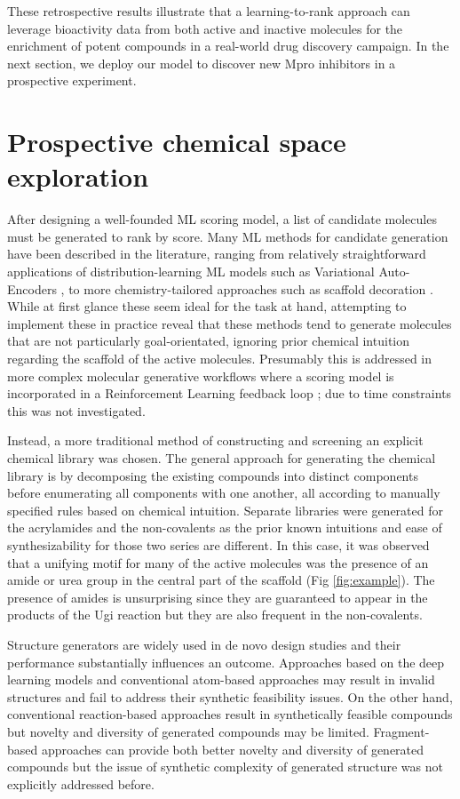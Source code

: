 These retrospective results illustrate that a learning-to-rank approach can leverage bioactivity data from both active and inactive molecules for the enrichment of potent compounds in a real-world drug discovery campaign. In the next section, we deploy our model to discover new Mpro inhibitors in a prospective experiment.

\section{Prospective chemical space exploration}

After designing a well-founded ML scoring model, a list of candidate molecules must be generated to rank by score. Many ML methods for candidate generation have been described in the literature, ranging from relatively straightforward applications of distribution-learning ML models such as Variational Auto-Encoders \cite{Bombarelli2018VAE}, to more chemistry-tailored approaches such as scaffold decoration \cite{Pous2020scaffold}. While at first glance these seem ideal for the task at hand, attempting to implement these in practice reveal that these methods tend to generate molecules that are not particularly goal-orientated, ignoring prior chemical intuition regarding the scaffold of the active molecules. Presumably this is addressed in more complex molecular generative workflows where a scoring model is incorporated in a Reinforcement Learning feedback loop \cite{born2019paccmannrl}; due to time constraints this was not investigated.

Instead, a more traditional method of constructing and screening an explicit chemical library was chosen. The general approach for generating the chemical library is by decomposing the existing compounds into distinct components before enumerating all components with one another, all according to manually specified rules based on chemical intuition. Separate libraries were generated for the acrylamides and the non-covalents as the prior known intuitions and ease of synthesizability for those two series are different. In this case, it was observed that a unifying motif for many of the active molecules was the presence of an amide or urea group in the central part of the scaffold (Fig \ref{fig:example}). The presence of amides is unsurprising since they are guaranteed to appear in the products of the Ugi reaction but they are also frequent in the non-covalents. 

Structure generators are widely used in de novo design studies and their performance substantially influences an outcome. Approaches based on the deep learning models and conventional atom-based approaches may result in invalid structures and fail to address their synthetic feasibility issues. On the other hand, conventional reaction-based approaches result in synthetically feasible compounds but novelty and diversity of generated compounds may be limited. Fragment-based approaches can provide both better novelty and diversity of generated compounds but the issue of synthetic complexity of generated structure was not explicitly addressed before.

